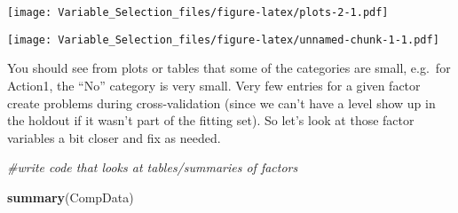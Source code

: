 \documentclass[]{article}
\newenvironment{Shaded}{\begin{snugshade}}{\end{snugshade}}
\newcommand{\CommentTok}[1]{\textcolor[rgb]{0.56,0.35,0.01}{\textit{#1}}}
\newcommand{\DataTypeTok}[1]{\textcolor[rgb]{0.13,0.29,0.53}{#1}}
\newcommand{\DecValTok}[1]{\textcolor[rgb]{0.00,0.00,0.81}{#1}}
\newcommand{\KeywordTok}[1]{\textcolor[rgb]{0.13,0.29,0.53}{\textbf{#1}}}
\newcommand{\NormalTok}[1]{#1}
\newcommand{\OperatorTok}[1]{\textcolor[rgb]{0.81,0.36,0.00}{\textbf{#1}}}
\newcommand{\StringTok}[1]{\textcolor[rgb]{0.31,0.60,0.02}{#1}}
\begin{document}
\texttt{[image: Variable\_Selection\_files/figure-latex/plots-2-1.pdf]}

\begin{Shaded}
\end{Shaded}

\texttt{[image: Variable\_Selection\_files/figure-latex/unnamed-chunk-1-1.pdf]}

You should see from plots or tables that some of the categories are
small, e.g.~for Action1, the ``No'' category is very small. Very few
entries for a given factor create problems during cross-validation
(since we can't have a level show up in the holdout if it wasn't part of
the fitting set). So let's look at those factor variables a bit closer
and fix as needed.

\begin{Shaded}
\begin{Highlighting}[]
\CommentTok{#write code that looks at tables/summaries of factors }


\KeywordTok{summary}\NormalTok{(CompData)}
\end{Highlighting}
\end{Shaded}
\end{document}
